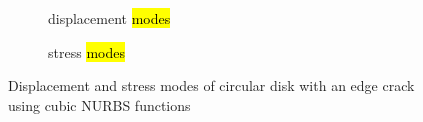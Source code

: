     \begin{figure}[h!]
        \begin{subfigure}[b]{1\linewidth}
            \centering
            \caption{displacement \hl{modes}}
        \end{subfigure}
        \begin{subfigure}[b]{1\linewidth}
            \centering
            \caption{stress \hl{modes}}
        \end{subfigure}
    \caption{Displacement and stress modes of circular disk with an edge crack using cubic NURBS functions}
    \label{iso_fig:circular_disk_modes}
    \end{figure}

